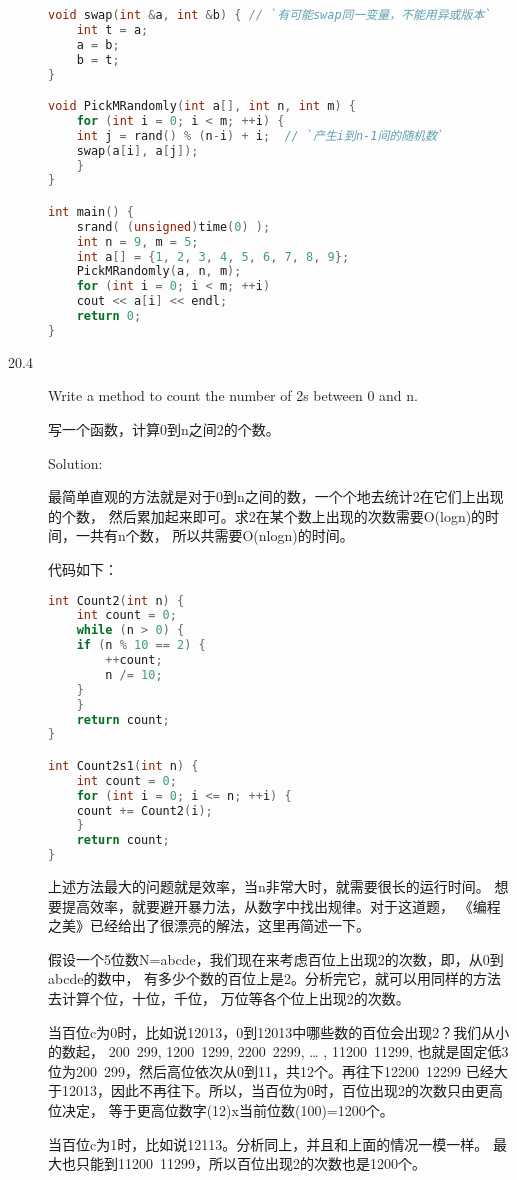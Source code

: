 \begin{description}
\begin{lstlisting}[language=C++]
void swap(int &a, int &b) { // `有可能swap同一变量，不能用异或版本`
    int t = a; 
    a = b;
    b = t;
}

void PickMRandomly(int a[], int n, int m) {
    for (int i = 0; i < m; ++i) {
	int j = rand() % (n-i) + i;  // `产生i到n-1间的随机数`
	swap(a[i], a[j]);
    }
}

int main() {
    srand( (unsigned)time(0) );
    int n = 9, m = 5;
    int a[] = {1, 2, 3, 4, 5, 6, 7, 8, 9};
    PickMRandomly(a, n, m);
    for (int i = 0; i < m; ++i) 
	cout << a[i] << endl;
    return 0;
}
\end{lstlisting}
%


\item[20.4] Write a method to count the number of 2s between 0 and n.

写一个函数，计算0到n之间2的个数。

Solution:

最简单直观的方法就是对于0到n之间的数，一个个地去统计2在它们上出现的个数， 然后累加起来即可。求2在某个数上出现的次数需要O(logn)的时间，一共有n个数， 所以共需要O(nlogn)的时间。

代码如下：
\begin{lstlisting}[language=C++]
int Count2(int n) {
    int count = 0;
    while (n > 0) {
	if (n % 10 == 2) {
	    ++count;
	    n /= 10;
	}
    }
    return count;
}

int Count2s1(int n) {
    int count = 0;
    for (int i = 0; i <= n; ++i) {
	count += Count2(i);
    }
    return count;
}
\end{lstlisting}
上述方法最大的问题就是效率，当n非常大时，就需要很长的运行时间。 想要提高效率，就要避开暴力法，从数字中找出规律。对于这道题， 《编程之美》已经给出了很漂亮的解法，这里再简述一下。

假设一个5位数N=abcde，我们现在来考虑百位上出现2的次数，即，从0到abcde的数中， 有多少个数的百位上是2。分析完它，就可以用同样的方法去计算个位，十位，千位， 万位等各个位上出现2的次数。

当百位c为0时，比如说12013，0到12013中哪些数的百位会出现2？我们从小的数起， 200~299, 1200~1299, 2200~2299, … , 11200~11299, 也就是固定低3位为200~299，然后高位依次从0到11，共12个。再往下12200~12299 已经大于12013，因此不再往下。所以，当百位为0时，百位出现2的次数只由更高位决定， 等于更高位数字(12)x当前位数(100)=1200个。

当百位c为1时，比如说12113。分析同上，并且和上面的情况一模一样。 最大也只能到11200~11299，所以百位出现2的次数也是1200个。


\end{description}
